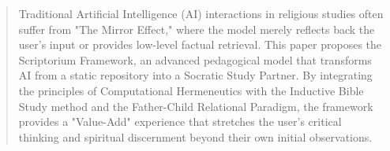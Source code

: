 \begin{abstract}
Traditional Artificial Intelligence (AI) interactions in religious studies often suffer from "The Mirror Effect," where the model merely reflects back the user's input or provides low-level factual retrieval. This paper proposes the Scriptorium Framework, an advanced pedagogical model that transforms AI from a static repository into a Socratic Study Partner. By integrating the principles of Computational Hermeneutics with the Inductive Bible Study method and the Father-Child Relational Paradigm, the framework provides a "Value-Add" experience that stretches the user’s critical thinking and spiritual discernment beyond their own initial observations.
\end{abstract}
